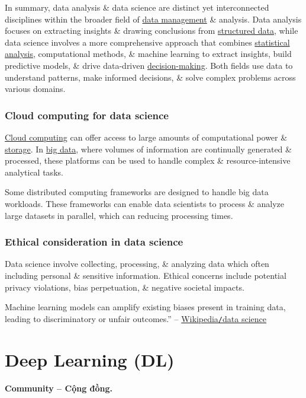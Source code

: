 \documentclass{article}
\begin{document}
In summary, data analysis \& data science are distinct yet interconnected disciplines within the broader field of \href{https://en.wikipedia.org/wiki/Data_management}{data management} \& analysis. Data analysis focuses on extracting insights \& drawing conclusions from \href{https://en.wikipedia.org/wiki/Structured_data}{structured data}, while data science involves a more comprehensive approach that combines \href{https://en.wikipedia.org/wiki/Statistical_analysis}{statistical analysis}, computational methods, \& machine learning to extract insights, build predictive models, \& drive data-driven \href{https://en.wikipedia.org/wiki/Decision-making}{decision-making}. Both fields use data to understand patterns, make informed decisions, \& solve complex problems across various domains.

\subsubsection{Cloud computing for data science}
\href{https://en.wikipedia.org/wiki/Cloud_computing}{Cloud computing} can offer access to large amounts of computational power \& \href{https://en.wikipedia.org/wiki/Data_storage}{storage}. In \href{https://en.wikipedia.org/wiki/Big_data}{big data}, where volumes of information are continually generated \& processed, these platforms can be used to handle complex \& resource-intensive analytical tasks.

Some distributed computing frameworks are designed to handle big data workloads. These frameworks can enable data scientists to process \& analyze large datasets in parallel, which can reducing processing times.

\subsubsection{Ethical consideration in data science}
Data science involve collecting, processing, \& analyzing data which often including personal \& sensitive information. Ethical concerns include potential privacy violations, bias perpetuation, \& negative societal impacts.

Machine learning models can amplify existing biases present in training data, leading to discriminatory or unfair outcomes.'' -- \href{https://en.wikipedia.org/wiki/Data_science}{Wikipedia{\tt/}data science}


\section{Deep Learning (DL)}
\textbf{\textsf{Community -- Cộng đồng.}} 
\end{document}
